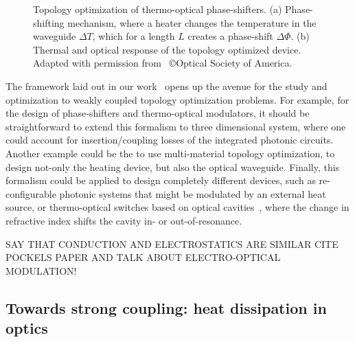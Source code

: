 \begin{figure}[tb]
    \centering
    \caption{Topology optimization of thermo-optical phase-shifters. (a) Phase-shifting mechanism, where a heater changes the temperature in the waveguide $\Delta T$, which for a length $L$ creates a phase-shift
    $\Delta \Phi$. (b) Thermal and optical response of the topology optimized device. Adapted with permission from~\cite{ownpub0} \copyright Optical Society of America.}
    \label{fig:thermo_res}
\end{figure}

The framework laid out in our work~\cite{ownpub0} opens up the avenue for the study and optimization to weakly coupled topology optimization problems. For example, for the design of phase-shifters and thermo-optical modulators, it should be straightforward to extend this
formalism to three dimensional system, where one could account for insertion/coupling losses of the integrated photonic circuits. Another example could be the to use multi-material topology optimization, to design not-only the heating
device, but also the optical waveguide. Finally, this formalism could be applied to design completely different devices, such as re-configurable photonic systems that might be modulated by an external heat source, or thermo-optical
switches based on optical cavities~\cite{switch, switch_2}, where the change in refractive index shifts the cavity in- or out-of-resonance.

SAY THAT CONDUCTION AND ELECTROSTATICS ARE SIMILAR CITE POCKELS PAPER AND TALK ABOUT ELECTRO-OPTICAL MODULATION!

\subsection*{Towards strong coupling: heat dissipation in optics}

